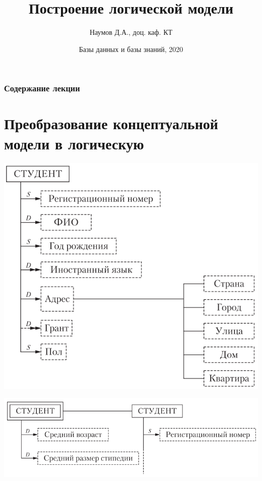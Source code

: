 \documentclass{beamer}
\title[Logical]{Построение логической модели}
\author{Наумов Д.А., доц. каф. КТ}
\date[02.03.2020] {Базы данных и базы знаний, 2020}
\begin{document}
\begin{frame}
  \titlepage
\end{frame}
  
\begin{frame}
  \frametitle{Содержание лекции}
  \tableofcontents  
\end{frame}
  
\section{Преобразование концептуальной модели в логическую}
\begin{frame}
\begin{center}
\includegraphics[scale=0.6]{images/lec03-pic02.png}
\end{center}
\end{frame}

\begin{frame}
\begin{center}
\includegraphics[scale=0.6]{images/lec03-pic03.png}
\end{center}
\end{frame}
\end{document}
